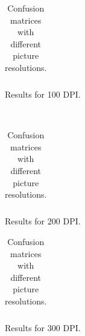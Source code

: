 \begin{table}[H]
    \centering
    \begin{subtable}{0.5\textwidth}
        \flushright
    \end{subtable}

    \begin{subtable}{0.1\textwidth}
        \flushright
    \end{subtable}
    \begin{subtable}{0.6\textwidth}
        \begin{subtable}{\textwidth}
            \centering
            {\scriptsize
                \begin{tabular}{l|*{10}{c}}
                    
                \end{tabular}
            }
            \caption{Results for 100 DPI.}
            \label{tab:confus_100}
        \end{subtable}
        \\
        \begin{subtable}{\textwidth}
        \vspace{0.4cm}
            \centering
            {\scriptsize
                \begin{tabular}{l|*{10}{c}}
                    
                \end{tabular}
            }
            \caption{Results for 200 DPI.}
            \label{tab:confus_200}
        \end{subtable}
        \begin{subtable}{\textwidth}
        \vspace{0.4cm}
            \centering
            {\scriptsize
                \begin{tabular}{l|*{10}{c}}
                    
                \end{tabular}
            }
            \caption{Results for 300 DPI.}
            \label{tab:confus_300}
        \end{subtable}
    \end{subtable}
    \caption{Confusion matrices with different picture resolutions.}
    \label{tb:confus}
\end{table}


